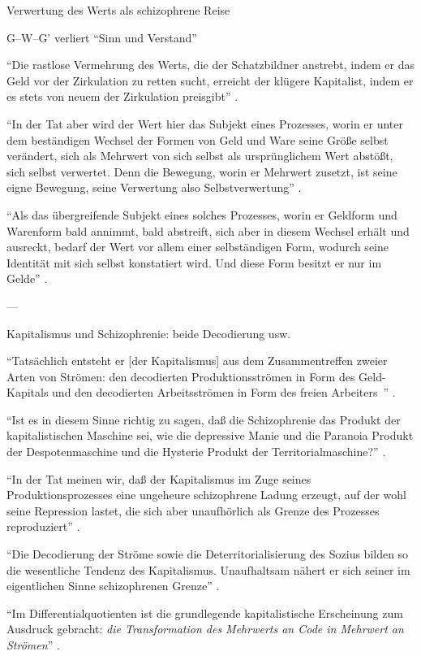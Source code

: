 \documentclass[12pt,
               DIV13,
               paper=a4,
               twoside=false,
               onehalfspacing,
               bibliography=totoc,
               toc=graduated,
               draft,
               ]{scrartcl}
\newcommand{\pc}[2]{\parencite[#1]{#2}}
\newcommand{\gwg}{G--W--G'\xspace}
\begin{document}
Verwertung des Werts als schizophrene Reise

\gwg verliert "`Sinn und Verstand"' \pc{166}{kap}

"`Die rastlose Vermehrung des Werts, die der Schatzbildner anstrebt,
indem er das Geld vor der Zirkulation zu retten sucht, erreicht der
klügere Kapitalist, indem er es stets von neuem der Zirkulation
preisgibt"' \pc{168}{kap}.

"`In der Tat aber wird der Wert hier das Subjekt eines Prozesses,
worin er unter dem beständigen Wechsel der Formen von Geld und Ware
seine Größe selbst verändert, sich als Mehrwert von sich selbst als
ursprünglichem Wert abstößt, sich selbst verwertet. Denn die Bewegung,
worin er Mehrwert zusetzt, ist seine eigne Bewegung, seine Verwertung
also Selbstverwertung"' \pc{169}{kap}.

"`Als das übergreifende Subjekt eines solches Prozesses, worin er
Geldform und Warenform bald annimmt, bald abstreift, sich aber in
diesem Wechsel erhält und ausreckt, bedarf der Wert vor allem einer
selbständigen Form, wodurch seine Identität mit sich selbst
konstatiert wird. Und diese Form besitzt er nur im Gelde"'
\pc{169}{kap}.

---

Kapitalismus und Schizophrenie: beide Decodierung usw.

"`Tatsächlich entsteht er [der Kapitalismus] aus dem Zusammentreffen
zweier Arten von Strömen: den decodierten Produktionsströmen in Form
des Geld-Kapitals und den decodierten Arbeitsströmen in Form des \glq
freien Arbeiters \grq\,"' \pc{44}{ao}.

"`Ist es in diesem Sinne richtig zu sagen, daß die Schizophrenie das
Produkt der kapitalistischen Maschine sei, wie die depressive Manie
und die Paranoia Produkt der Despotenmaschine und die Hysterie Produkt
der Territorialmaschine?"' \pc{44}{ao}.

"`In der Tat meinen wir, daß der Kapitalismus im Zuge seines
Produktionsprozesses eine ungeheure schizophrene Ladung erzeugt, auf
der wohl seine Repression lastet, die sich aber unaufhörlich als
Grenze des Prozesses reproduziert"' \pc{45}{ao}.

"`Die Decodierung der Ströme sowie die Deterritorialisierung des
Sozius bilden so die wesentliche Tendenz des Kapitalismus.
Unaufhaltsam nähert er sich seiner im eigentlichen Sinne schizophrenen
Grenze"' \pc{44}{ao}.

"`Im Differentialquotienten ist die grundlegende kapitalistische
Erscheinung zum Ausdruck gebracht: \emph{die Transformation des
Mehrwerts an Code in Mehrwert an Strömen}"' \pc{S. 292 f.}{ao}.
\end{document}
